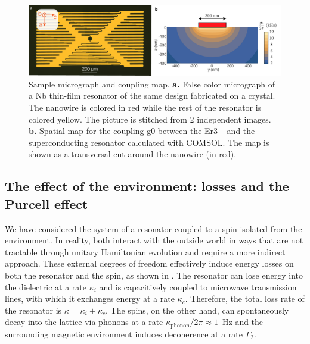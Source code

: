 \begin{figure}
    \includegraphics{chapter2/figures/sample.pdf}
    \caption[Sample micrograph and coupling map]{Sample micrograph and coupling map. \textbf{a.} False color micrograph of a Nb thin-film resonator of the same design fabricated on a \Ca crystal. The nanowire is colored in red while the rest of the resonator is colored yellow. The picture is stitched from 2 independent images. 
    \textbf{b.} Spatial map for the coupling g0 between the Er3+ and the superconducting resonator calculated with COMSOL. The map is shown as a transversal cut around the nanowire (in red).}
\end{figure}

\subsection{The effect of the environment: losses and the Purcell effect}

We have considered the system of a resonator coupled to a spin isolated from the environment. In reality, both interact with the outside world in ways that are not tractable through unitary Hamiltonian evolution and require a more indirect approach. These external degrees of freedom effectively induce energy losses on both the resonator and the spin, as shown in . The resonator can lose energy into the dielectric at a rate $\kappa_i$ and is capacitively coupled to microwave transmission lines, with which it exchanges energy at a rate $\kappa_c$. Therefore, the total loss rate of the resonator is $\kappa = \kappa_i + \kappa_c$.  The spins, on the other hand, can spontaneously decay into the lattice via phonons at a rate $\kappa_\text{phonon}/2\pi \approx 1$~Hz  and the surrounding magnetic environment induces decoherence at a rate $\Gamma_2$.

